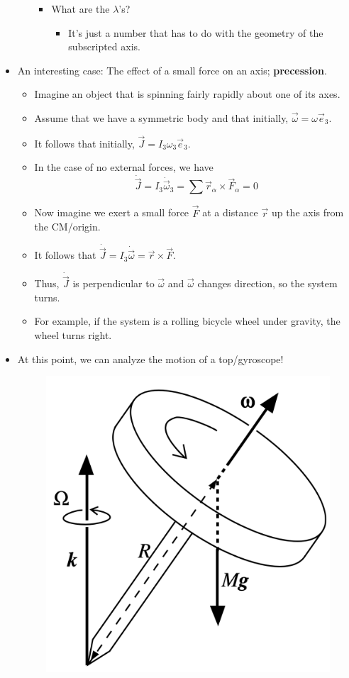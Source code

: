 \documentclass[../notes.tex]{subfiles}
\begin{document}
\begin{itemize}
\begin{enumerate}
\begin{itemize}
\begin{itemize}
            \end{itemize}
            \item What are the $\lambda$'s?
            \begin{itemize}
                \item It's just a number that has to do with the geometry of the subscripted axis.
            \end{itemize}
        \end{itemize}
    \end{enumerate}
    \item An interesting case: The effect of a small force on an axis; \textbf{precession}.
    \begin{itemize}
        \item Imagine an object that is spinning fairly rapidly about one of its axes.
        \item Assume that we have a symmetric body and that initially, $\vec{\omega}=\omega\vec{e}_3$.
        \item It follows that initially, $\vec{J}=I_3\omega_3\vec{e}_3$.
        \item In the case of no external forces, we have
        \begin{equation*}
            \dot{\vec{J}} = I_3\dot{\vec{\omega}}_3
            = \sum\vec{r}_\alpha\times\vec{F}_\alpha
            = 0
        \end{equation*}
        \item Now imagine we exert a small force $\vec{F}$ at a distance $\vec{r}$ up the axis from the CM/origin.
        \item It follows that $\dot{\vec{J}}=I_3\dot{\vec{\omega}}=\vec{r}\times\vec{F}$.
        \item Thus, $\dot{\vec{J}}$ is perpendicular to $\vec{\omega}$ and $\vec{\omega}$ changes direction, so the system turns.
        \item For example, if the system is a rolling bicycle wheel under gravity, the wheel turns right.
    \end{itemize}
    \item At this point, we can analyze the motion of a top/gyroscope!
    \begin{figure}[h!]
        \centering
        \includegraphics[width=0.2\linewidth]{../ExtFiles/topGyroscope.png}

\end{figure}
\end{itemize}
\end{document}
